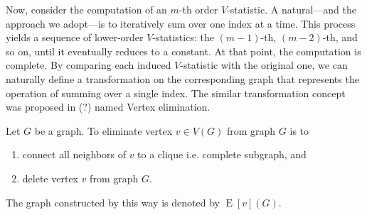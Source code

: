 \documentclass[letterpaper,11pt]{article}
\newcommand{\verticesg}[1]{V(#1)}
\newcommand{\edgesg}[1]{E(#1)}
\newcommand{\neighborsvg}[2]{N(#1,#2)}
\newcommand{\eliminatevg}[2]{\operatorname{E}[#1](#2)}
\begin{document}
\begin{bibunit}[plainnat]

Now, consider the computation of an $m$-th order $V$-statistic. A natural—and the approach we adopt—is to iteratively sum over one index at a time. This process yields a sequence of lower-order $V$-statistics: the $(m-1)$-th, $(m-2)$-th, and so on, until it eventually reduces to a constant. At that point, the computation is complete. By comparing each induced $V$-statistic with the original one, we can naturally define a transformation on the corresponding graph that represents the operation of summing over a single index. The similar transformation concept was proposed in (?) named Vertex elimination. 


\begin{definition}
\label{def:vertex_elimination_of_graph}
    Let $G$ be a graph. To eliminate vertex $v \in \verticesg{G}$ from graph $G$ is to 
    \begin{enumerate}
        \item connect all neighbors of $v$ to a clique i.e. complete subgraph, and
        \item delete vertex $v$ from graph $G$. 
    \end{enumerate}
    The graph constructed by this way is denoted by $
    \eliminatevg{v}{G}$. 
\end{definition}





\end{bibunit}
\end{document}
